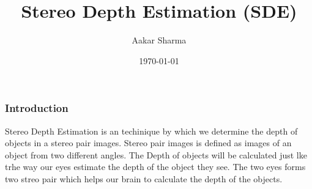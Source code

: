 \documentclass{beamer}
\title[Stereo Depth Estimation (SDE)]{Stereo Depth Estimation (SDE)} %
\author{Aakar Sharma} %
\institute[IITJ] %
{
Indian Instituite of Technology Jammu \\ %
\medskip
\textit{2016ucs0066@iitjammu.ac.in} %
}
\date{\today} %
\begin{document}
\begin{frame}
\titlepage %
\end{frame}


\begin{frame}
\frametitle{Introduction}
Stereo Depth Estimation is an techinique by which we determine the depth of objects in a stereo pair images. Stereo pair images is defined as images of an object from two different angles. The Depth of objects will be calculated just lke trhe way our eyes estimate the depth of the object they see. The two eyes forms two streo pair which helps our brain to calculate the depth of the objects.
\end{frame}

\end{document}
